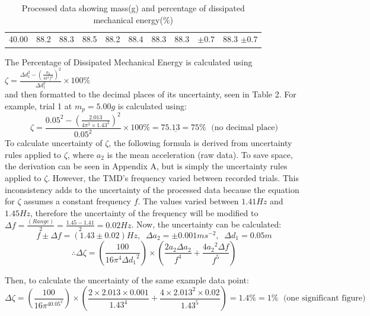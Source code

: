 \documentclass[11pt]{article}
\begin{document}
\begin{table}[h]
\begin{tabular}{cccccccccc}
\rowcolor[HTML]{EFEFEF} 
40.00                                                 & \multicolumn{1}{r}{\cellcolor[HTML]{EFEFEF}88.2} & \multicolumn{1}{r}{\cellcolor[HTML]{EFEFEF}88.3} & \multicolumn{1}{r}{\cellcolor[HTML]{EFEFEF}88.5} & \multicolumn{1}{r}{\cellcolor[HTML]{EFEFEF}88.2} & \multicolumn{1}{r}{\cellcolor[HTML]{EFEFEF}88.4} & \multicolumn{1}{r}{\cellcolor[HTML]{EFEFEF}88.3} & \multicolumn{1}{r}{\cellcolor[HTML]{EFEFEF}88.3} & $\pm 0.7$                                                          & 88.3 $\pm 0.7$                                                    
\end{tabular}
\caption{\label{tbl:2}Processed data showing mass(g) and percentage of dissipated mechanical energy($\%$)}
\end{table}


The Percentage of Dissipated Mechanical Energy is calculated using $\zeta=\frac{\Delta d_1^2-(\frac{a_2}{4\pi^2f^2})^2}{\Delta d_1^2} \times 100\%$ \\
and then formatted to the decimal places of its uncertainty, seen in Table 2. 
For example, trial 1 at $m_p=5.00g$ is calculated using: 
$$\zeta=\frac{0.05^2-(\frac{2.013}{4\pi^2\times1.43^2})^2}{0.05^2} \times 100\% = 75.\underline{13}=75 \% \; \textrm{  (no decimal place)}$$
To calculate uncertainty of $\zeta$, the following formula is derived from uncertainty rules applied to $\zeta$, where $a_2$ is the mean acceleration (raw data). To save space, the derivation can be seen in Appendix A, but is simply the uncertainty rules applied to $\zeta$. However, the TMD's frequency varied between recorded trials. This inconsistency adds to the uncertainty of the processed data because the equation for $\zeta$ assumes a constant frequency $f$. The values varied between $1.41Hz$ and $1.45Hz$, therefore the uncertainty of the frequency will be modified to $\Delta f = \frac{(Range)}{2} = \frac{1.45-1.41}{2} = 0.02Hz$. Now, the uncertainty can be calculated:
$$f \pm \Delta f = (1.43 \pm 0.02)Hz, \; \; \Delta a_2 = \pm 0.001ms^{-2}, \; \; \Delta d_1 = 0.05m$$
$$\therefore \Delta \zeta = (\frac{100}{16\pi^4\Delta {d_1}^2})\times(\frac{2a_2 \Delta a_2}{f^4} + \frac{4{a_2}^2\Delta f}{f^5})$$

Then, to calculate the uncertainty of the same example data point:
$$\Delta \zeta = (\frac{100}{16\pi^40.05^2})\times(\frac{2\times2.013 \times0.001}{1.43^4} + \frac{4\times2.013^2\times0.02}{1.43^5})=1.4\% = 1\% \; \textrm{  (one significant figure)}$$
\end{document}
